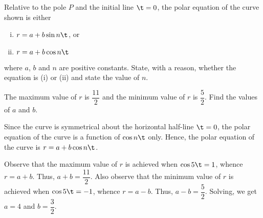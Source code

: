 \documentclass{echw}
\begin{document}

    \problem{}
        \begin{center}
        \end{center}
         Relative to the pole $P$ and the initial line $\t = 0$, the polar equation of the curve shown is either
        
        \begin{enumerate}[i.]
            \item $r = a+b\sin n\t$, or
            \item $r = a + b\cos n \t$
        \end{enumerate}
         where $a$, $b$ and $n$ are positive constants. State, with a reason, whether the equation is (i) or (ii) and state the value of $n$.

        The maximum value of $r$ is $\dfrac{11}2$ and the minimum value of $r$ is $\dfrac52$. Find the values of $a$ and $b$.

    \solution
        Since the curve is symmetrical about the horizontal half-line $\t = 0$, the polar equation of the curve is a function of $\cos n\t$ only. Hence, the polar equation of the curve is $r = a+b\cos n\t$.


        Observe that the maximum value of $r$ is achieved when $\cos 5\t = 1$, whence $r = a + b$. Thus, $a + b = \dfrac{11}2$. Also observe that the minimum value of $r$ is achieved when $\cos 5\t = -1$, whence $r = a-b$. Thus, $a - b = \dfrac52$. Solving, we get $a = 4$ and $b = \dfrac32$.
\end{document}
